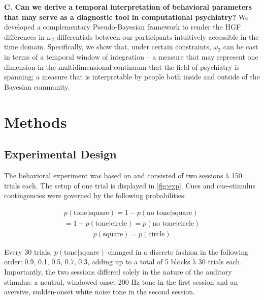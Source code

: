 \documentclass{article}
\begin{document}
\begin{multicols}{2}
\textbf{C. Can we derive a temporal interpretation of behavioral parameters that may serve as a  diagnostic tool in computational psychiatry?}
We developed a complementary Pseudo-Bayesian framework to render the HGF differences in $\omega_{2}$-differentials between our participants intuitively accessible in the time domain. Specifically, we show that, under certain constraints, $\omega_{2}$ can be cast in terms of a \textsf{temporal window of integration} -- a measure that may represent one dimension in the multidimensional continuum that the field of psychiatry is spanning; a measure that is interpretable by people both inside and outside of the Bayesian community. 

\section*{Methods}
\label{sec:meth}
\subsection*{Experimental Design}

The behavioral experiment was based on \cite{iglesias2013hierarchical} and consisted of two sessions \`{a} 150 trials each. The setup of one trial is displayed in \autoref{fig:exp}. Cues and cue-stimulus contingencies were governed by the following probabilities: 

\begin{ceqn}
\begin{align}
 p(\text{tone}|\text{square}) = 1-p(\text{no tone}|\text{square}) \\
= 1-p(\text{tone}|\text{circle}) = p(\text{no tone}|\text{circle}) \nonumber 
\end{align}
\begin{align}
p(\text{square}) = p(\text{circle})
\end{align}
\end{ceqn}

Every 30 trials, $p(\text{tone}|\text{square} )$ changed in a discrete fashion in the following order: 0.9, 0.1, 0.5, 0.7, 0.3, adding up to a total of 5 blocks \`{a} 30 trials each. Importantly, the two sessions differed solely in the nature of the auditory stimulus: a neutral, windowed onset 200 Hz tone in the first session and an aversive, sudden-onset white noise tone in the second session. \\


\end{multicols}
\end{document}
